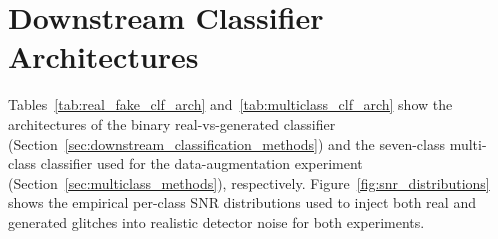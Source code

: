 \documentclass[reprint,nofootinbib,amsmath,amssymb,aps,floatfix]{revtex4-2}
\begin{document}
\begin{table}[h]
\centering
\caption[Hyperparameters for t-SNE and UMAP]{Hyperparameters for t-SNE and UMAP. For UMAP, \textbf{bold} values give the primary configuration used for the Figures~\protect\ref{fig:umap_two_views} and~\protect\ref{fig:umap_per_class_rotated}; the additional plain values were swept over to confirm the real/fake patterns are consistent and not an artifact of one particular embedding (9 total (\texttt{Random\_state}, \texttt{(N\_neighbors, Min\_dist)}) combinations: seeds $\{0,1,2\}$ $\times$ the three neighbor/distance pairs listed).}
\label{tab:hyperparameters}
\end{table}

\section{\label{sec:downstream_classifier_architectures}Downstream Classifier Architectures}

Tables~\ref{tab:real_fake_clf_arch} and~\ref{tab:multiclass_clf_arch} show the architectures of the binary real-vs-generated classifier (Section~\ref{sec:downstream_classification_methods}) and the seven-class multi-class classifier used for the data-augmentation experiment (Section~\ref{sec:multiclass_methods}), respectively. 
Figure~\ref{fig:snr_distributions} shows the empirical per-class SNR distributions used to inject both real and generated glitches into realistic detector noise for both experiments.
\end{document}
